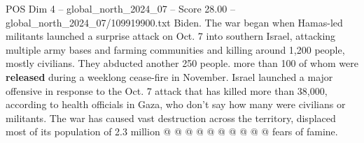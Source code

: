 \begin{textsample}{POS Dim 4 – global\_north\_2024\_07 – Score 28.00 – global\_north\_2024\_07/109919900.txt}
Biden.
The war began when Hamas-led militants launched a surprise attack on Oct. 7 into southern Israel, attacking multiple army bases and farming communities and killing around 1,200 people, mostly civilians.
They abducted another 250 people. more than 100 of whom were \textbf{released} during a weeklong cease-fire in November.
Israel launched a major offensive in response to the Oct. 7 attack that has killed more than 38,000, according to health officials in Gaza, who don't say how many were civilians or militants.
The war has caused vast destruction across the territory, displaced most of its population of 2.3 million @ @ @ @ @ @ @ @ @ @ fears of famine.

\end{textsample}
